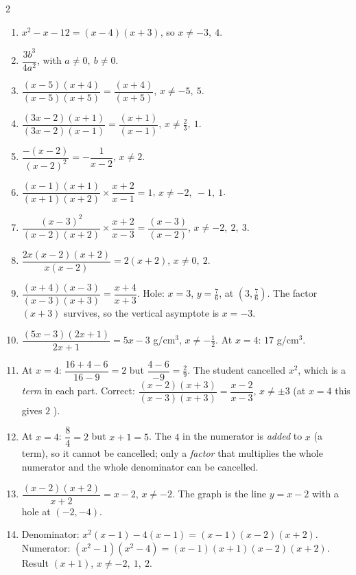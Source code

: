 \documentclass[11pt]{article}
\begin{document}
\begin{keybox}
\begin{multicols}{2}
\small
\begin{enumerate}[leftmargin=*,itemsep=3pt]
  \item $x^2-x-12=(x-4)(x+3)$, so $x\ne -3,\ 4$.
  \item $\dfrac{3b^3}{4a^2}$, with $a\ne0,\ b\ne0$.
  \item $\dfrac{(x-5)(x+4)}{(x-5)(x+5)}=\dfrac{(x + 4)}{(x + 5)}$, $x\ne -5,\ 5$.
  \item $\dfrac{(3x-2)(x+1)}{(3x-2)(x-1)}=\dfrac{(x + 1)}{(x - 1)}$, $x\ne \tfrac{2}{3},\ 1$.
  \item $\dfrac{-(x-2)}{(x-2)^2}=-\dfrac{1}{x-2}$, $x\ne2$.
  \item $\dfrac{(x-1)(x+1)}{(x+1)(x+2)}\times\dfrac{x+2}{x-1}=1$, $x\ne -2,\ -1,\ 1$.
  \item $\dfrac{(x-3)^2}{(x-2)(x+2)}\times\dfrac{x+2}{x-3}=\dfrac{(x - 3)}{(x - 2)}$, $x\ne -2,\ 2,\ 3$.
  \item $\dfrac{2x(x-2)(x+2)}{x(x-2)}=2(x+2)$, $x\ne 0,\ 2$.
  \item $\dfrac{(x+4)(x-3)}{(x-3)(x+3)}=\dfrac{x+4}{x+3}$. Hole: $x=3$, $y=\tfrac76$, at $(3,\tfrac76)$. The factor $(x+3)$ survives, so the vertical asymptote is $x=-3$.
  \item $\dfrac{(5x-3)(2x+1)}{2x+1}=5x-3$ g/cm$^3$, $x\ne-\tfrac12$. At $x=4$: $17$ g/cm$^3$.
  \item At $x=4$: $\dfrac{16+4-6}{16-9}=2$ but $\dfrac{4-6}{-9}=\tfrac29$. The student cancelled $x^2$, which is a \emph{term} in each part. Correct: $\dfrac{(x-2)(x+3)}{(x-3)(x+3)}=\dfrac{x-2}{x-3}$, $x\ne\pm3$ (at $x=4$ this gives $2$ \checkmark).
  \item At $x=4$: $\dfrac{8}{4}=2$ but $x+1=5$. The $4$ in the numerator is \emph{added} to $x$ (a term), so it cannot be cancelled; only a \emph{factor} that multiplies the whole numerator and the whole denominator can be cancelled.
  \item $\dfrac{(x-2)(x+2)}{x+2}=x-2$, $x\ne-2$. The graph is the line $y=x-2$ with a hole at $(-2,-4)$.
  \item Denominator: $x^2(x-1)-4(x-1)=(x-1)(x-2)(x+2)$. Numerator: $(x^2-1)(x^2-4)=(x-1)(x+1)(x-2)(x+2)$. Result $(x + 1)$, $x\ne -2,\ 1,\ 2$.
\end{enumerate}
\end{multicols}
\end{keybox}
\end{document}
